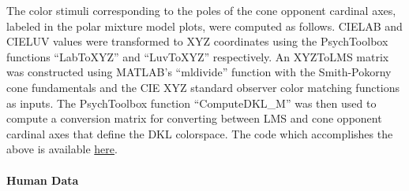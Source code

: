 The color stimuli corresponding to the poles of the cone opponent cardinal axes, labeled in the polar mixture model plots, were computed as follows. 
CIELAB and CIELUV values were transformed to XYZ coordinates using the PsychToolbox functions “LabToXYZ” and “LuvToXYZ” respectively.
An XYZToLMS matrix was constructed using MATLAB's “mldivide” function with the Smith-Pokorny cone fundamentals and the CIE XYZ standard observer color matching functions as inputs.
The PsychToolbox function “ComputeDKL\_M” was then used to compute a conversion matrix for converting between LMS and cone opponent cardinal axes that define the DKL colorspace. 
The code which accomplishes the above is available \href{https://github.com/NEI-LSR/MacaqueColorCategories/blob/main/Analyses/DKL/computeDKL_XYZ.m}{here}.

\paragraph{Human Data}

